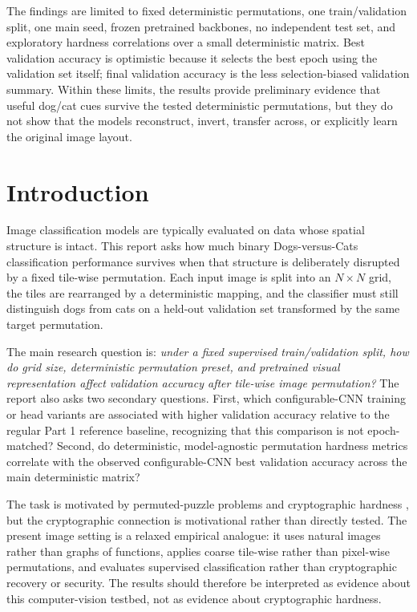 \documentclass[12pt]{article}
\begin{document}
\par\smallskip\noindent The findings are limited to fixed deterministic permutations, one train/validation split, one main seed, frozen pretrained backbones, no independent test set, and exploratory hardness correlations over a small deterministic matrix. Best validation accuracy is optimistic because it selects the best epoch using the validation set itself; final validation accuracy is the less selection-biased validation summary. Within these limits, the results provide preliminary evidence that useful dog/cat cues survive the tested deterministic permutations, but they do not show that the models reconstruct, invert, transfer across, or explicitly learn the original image layout.

\vspace{0.8em}

\section{Introduction}

Image classification models are typically evaluated on data whose spatial structure is intact. This report asks how much binary Dogs-versus-Cats classification performance survives when that structure is deliberately disrupted by a fixed tile-wise permutation. Each input image is split into an $N \times N$ grid, the tiles are rearranged by a deterministic mapping, and the classifier must still distinguish dogs from cats on a held-out validation set transformed by the same target permutation.

The main research question is: \emph{under a fixed supervised train/validation split, how do grid size, deterministic permutation preset, and pretrained visual representation affect validation accuracy after tile-wise image permutation?} The report also asks two secondary questions. First, which configurable-CNN training or head variants are associated with higher validation accuracy relative to the regular Part 1 reference baseline, recognizing that this comparison is not epoch-matched? Second, do deterministic, model-agnostic permutation hardness metrics correlate with the observed configurable-CNN best validation accuracy across the main deterministic matrix?

The task is motivated by permuted-puzzle problems and cryptographic hardness \citep{boyle2019permuted}, but the cryptographic connection is motivational rather than directly tested. The present image setting is a relaxed empirical analogue: it uses natural images rather than graphs of functions, applies coarse tile-wise rather than pixel-wise permutations, and evaluates supervised classification rather than cryptographic recovery or security. The results should therefore be interpreted as evidence about this computer-vision testbed, not as evidence about cryptographic hardness.
\end{document}
